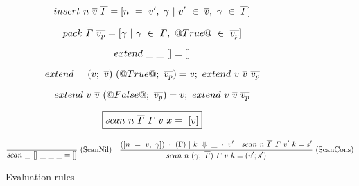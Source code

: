 \begin{figure*}
$$
\mit{insert}~n~\overline{v}~\overline{\Gamma}
=
[n~=~v',~\gamma ~|~ v' ~\in~ \overline{v},~ \gamma ~\in~ \overline{\Gamma} ]
$$

$$
\mit{pack}~\overline{\Gamma}~\overline{v_p}
= [\gamma~|~\gamma~\in~\overline{\Gamma},~@True@~\in~\overline{v_p}]
$$

$$
\mit{extend}~\_~\_~[]
= []
$$

$$
\mit{extend}~\_~(v;~\overline{v})~(@True@;~\overline{v_p})
= v;~\mit{extend}~v~\overline{v}~\overline{v_p}
$$

$$
\mit{extend}~v~\overline{v}~(@False@;~\overline{v_p})
= v;~\mit{extend}~v~\overline{v}~\overline{v_p}
$$

$$
\boxed{\mit{scan}~n~\overline{\Gamma}~\Gamma~v~x=~[v]}
$$

$$
\frac {\displaystyle 
} {\displaystyle 
    \mit{scan}~\_~[]~\_~\_~\_ = []
} \ 
\textrm{(ScanNil)}
\quad
\frac {\displaystyle 
    ([n~=~v,~\gamma]) ~\cdot~ (\Gamma) ~|~ k ~\Downarrow~ \_ ~\cdot~ v'
    \quad
    \mit{scan}~n~\overline{\Gamma}~\Gamma~v'~k
    = s'
} {\displaystyle 
    \mit{scan}~n~(\gamma;~\overline{\Gamma})~\Gamma~v~k
    = (v'; s')
} \ 
\textrm{(ScanCons)}
$$

\caption{Evaluation rules}
\label{fig:source:eval}
\end{figure*}


